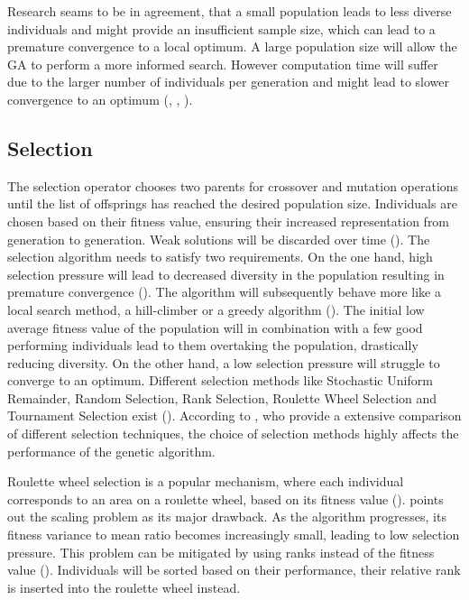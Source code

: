 Research seams to be in agreement, that a small population leads to less diverse individuals and might provide an insufficient sample size, which can lead to a premature convergence to a local optimum.
A large population size will allow the GA to perform a more informed search. However computation time will suffer due to the larger number of individuals per generation and might lead to slower convergence to an optimum (\cite{grefenstette_optimization_1986}, \cite{katoch_review_2021}, \cite{kacprzyk_parameter_2007}).

\subsection{Selection}
The selection operator chooses two parents for crossover and mutation operations until the list of offsprings has reached the desired population size. Individuals are chosen based on their fitness value, ensuring their increased representation from generation to generation. Weak solutions will be discarded over time (\cite{srinivas_genetic_1994}). The selection algorithm needs to satisfy two requirements. On the one hand, high selection pressure will lead to decreased diversity in the population resulting in premature convergence (\cite{katoch_review_2021}). The algorithm will subsequently behave more like a local search method, a hill-climber or a greedy algorithm (\cite{kacprzyk_parameter_2007}). The initial low average fitness value of the population will in combination with a few good performing individuals lead to them overtaking the population, drastically reducing diversity. On the other hand, a low selection pressure will struggle to converge to an optimum. Different selection methods like Stochastic Uniform Remainder, Random Selection, Rank Selection, Roulette Wheel Selection and Tournament Selection exist (\cite{majumdar_genetic_2015}). According to \cite{hussain_trade-off_2020}, who provide a extensive comparison of different selection techniques, the choice of selection methods highly affects the performance of the genetic algorithm.

Roulette wheel selection is a popular mechanism, where each individual corresponds to an area on a roulette wheel, based on its fitness value (\cite{holland_adaptation_1992}). \cite{grefenstette_optimization_1986} points out the scaling problem as its major drawback. As the algorithm progresses, its fitness variance to mean ratio becomes increasingly small, leading to low selection pressure.
This problem can be mitigated by using ranks instead of the fitness value (\cite{katoch_review_2021}). Individuals will be sorted based on their performance, their relative rank is inserted into the roulette wheel instead. 

